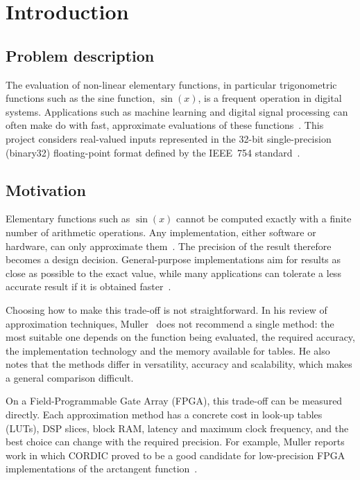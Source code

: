 
\chapter{Introduction}
\label{ch:introduction}

\section{Problem description}
\label{sec:problem}
The evaluation of non-linear elementary functions, in particular trigonometric
functions such as the sine function, $\sin(x)$, is a frequent operation in
digital systems. Applications such as machine learning and digital signal
processing can often make do with fast, approximate evaluations of these
functions~\cite{muller2020}.
This project considers real-valued inputs represented in the 32-bit single-precision
(binary32) floating-point format defined by the IEEE~754 standard~\cite{ieee754}.

\section{Motivation}
\label{sec:motivation}
Elementary functions such as $\sin(x)$ cannot be computed exactly with a finite
number of arithmetic operations. Any implementation, either software or hardware,
can only approximate them~\cite{muller2020}. The precision of the result therefore
becomes a design decision. General-purpose implementations aim for results as
close as possible to the exact value, while many applications can tolerate a less
accurate result if it is obtained faster~\cite{muller2020}.

Choosing how to make this trade-off is not straightforward. In his review of
approximation techniques, Muller~\cite{muller2020} does not recommend a single
method: the most suitable one depends on the function being evaluated, the
required accuracy, the implementation technology and the memory available for
tables. He also notes that the methods differ in versatility, accuracy and
scalability, which makes a general comparison difficult.

On a Field-Programmable Gate Array (FPGA), this trade-off can be measured
directly. Each approximation method has a concrete cost in look-up tables (LUTs),
DSP slices, block RAM, latency and maximum clock frequency, and the best choice
can change with the required precision. For example, Muller reports work in which
CORDIC proved to be a good candidate for low-precision FPGA implementations of the
arctangent function~\cite{muller2020}.


